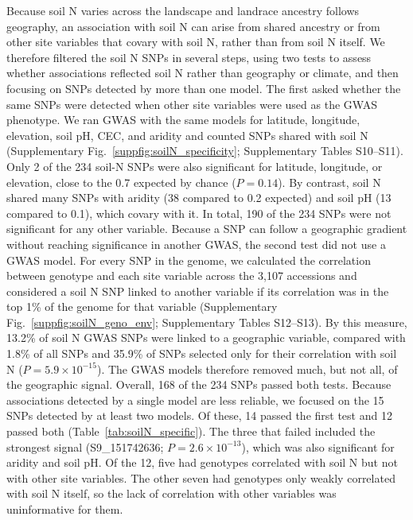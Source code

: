 Because soil N varies across the landscape and landrace ancestry follows geography, an association with soil N can arise from shared ancestry or from other site variables that covary with soil N, rather than from soil N itself. We therefore filtered the soil N SNPs in several steps, using two tests to assess whether associations reflected soil N rather than geography or climate, and then focusing on SNPs detected by more than one model. The first asked whether the same SNPs were detected when other site variables were used as the GWAS phenotype. We ran GWAS with the same models for latitude, longitude, elevation, soil pH, CEC, and aridity and counted SNPs shared with soil N (Supplementary Fig.~\ref{suppfig:soilN_specificity}; Supplementary Tables S10--S11). Only 2 of the 234 soil-N SNPs were also significant for latitude, longitude, or elevation, close to the 0.7 expected by chance ($P = 0.14$). By contrast, soil N shared many SNPs with aridity (38 compared to 0.2 expected) and soil pH (13 compared to 0.1), which covary with it. In total, 190 of the 234 SNPs were not significant for any other variable. Because a SNP can follow a geographic gradient without reaching significance in another GWAS, the second test did not use a GWAS model. For every SNP in the genome, we calculated the correlation between genotype and each site variable across the 3,107 accessions and considered a soil N SNP linked to another variable if its correlation was in the top 1\% of the genome for that variable (Supplementary Fig.~\ref{suppfig:soilN_geno_env}; Supplementary Tables S12--S13). By this measure, 13.2\% of soil N GWAS SNPs were linked to a geographic variable, compared with 1.8\% of all SNPs and 35.9\% of SNPs selected only for their correlation with soil N ($P = 5.9 \times 10^{-15}$). The GWAS models therefore removed much, but not all, of the geographic signal. Overall, 168 of the 234 SNPs passed both tests. Because associations detected by a single model are less reliable, we focused on the 15 SNPs detected by at least two models. Of these, 14 passed the first test and 12 passed both (Table~\ref{tab:soilN_specific}). The three that failed included the strongest signal (S9\_151742636; $P = 2.6 \times 10^{-13}$), which was also significant for aridity and soil pH. Of the 12, five had genotypes correlated with soil N but not with other site variables. The other seven had genotypes only weakly correlated with soil N itself, so the lack of correlation with other variables was uninformative for them.

